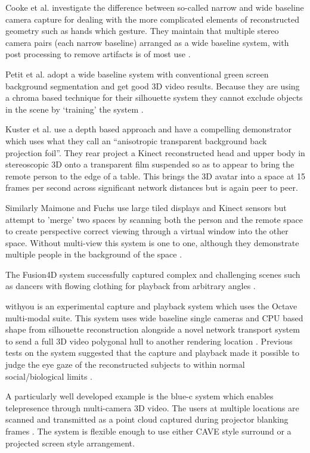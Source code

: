                         Cooke et al. investigate the difference between so-called narrow and wide baseline camera capture for dealing with the more complicated elements of reconstructed geometry such as hands which gesture. They maintain that multiple stereo camera pairs (each narrow baseline) arranged as a wide baseline system, with post processing to remove artifacts is of most use \cite{Cooke_image-basedrendering}.\par
                        Petit et al. adopt a wide baseline system with conventional green screen background segmentation and get good 3D video results. Because they are using a chroma based technique for their silhouette system they cannot exclude objects in the scene by `training' the system \cite{Petit2010}.\par
Kuster et al. use a depth based approach and have a compelling demonstrator which uses what they call an ``anisotropic transparent background back projection foil''. They rear project a Kinect reconstructed head and upper body in stereoscopic 3D onto a transparent film suspended so as to appear to bring the remote person to the edge of a table. This brings the 3D avatar into a space at 15 frames per second across significant network distances but is again peer to peer\cite{Kuster2012a}.\par
Similarly Maimone and Fuchs use large tiled displays and Kinect sensors but attempt to 'merge' two spaces by scanning both the person and the remote space to create perspective correct viewing through a virtual window into the other space. Without multi-view this system is one to one, although they demonstrate multiple people in the background of the space \cite{Maimone2011a}.\par
       The Fusion4D system successfully captured complex and challenging scenes such as dancers with flowing clothing for playback from arbitrary angles \cite{Dou2016}.\par
withyou is an experimental capture and playback system which uses the Octave multi-modal suite. This system uses wide baseline single cameras and CPU based shape from silhouette reconstruction alongside a novel network transport system to send a full 3D video polygonal hull to another rendering location \cite{Roberts2015}. Previous tests on the system suggested that the capture and playback made it possible to judge the eye gaze of the reconstructed subjects to within normal social/biological limits \cite{Roberts2013}.\par
A particularly well developed example is the blue-c system which enables telepresence through multi-camera 3D video. The users at multiple locations are scanned and transmitted as a point cloud captured during projector blanking frames \cite{Gross2003}. The system is flexible enough to use either CAVE style surround or a projected screen style arrangement.\par
